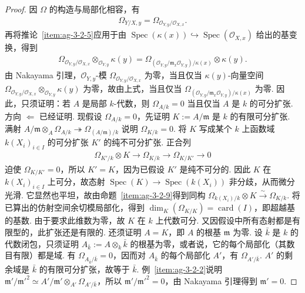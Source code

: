 \begin{proof}
因 $\Omega$ 的构造与局部化相容，有
\begin{align*}
\Omega_{Y/X,y}=\Omega_{\mathcal O_{Y,y}/\mathcal O_{X,x}}.
\end{align*}
再将推论~\ref{item:ag-3-2-5}应用于由 $\operatorname{Spec}(\kappa(x))\hookrightarrow\operatorname{Spec}(\mathcal O_{X,x})$ 给出的基变换，得到
\begin{align*}
\Omega_{\mathcal O_{Y,y}/\mathcal O_{X,x}}\otimes_{\mathcal O_{Y,y}}\kappa(y)=\Omega_{(\mathcal O_{Y,y}/\mathfrak m_x\mathcal O_{Y,y})/\kappa(x)}\otimes\kappa(y).
\end{align*}
由 Nakayama 引理，$\mathcal O_{Y,y}$-模 $\Omega_{\mathcal O_{Y,y}/\mathcal O_{X,x}}$ 为零，当且仅当 $\kappa(y)$-向量空间 $\Omega_{\mathcal O_{Y,y}/\mathcal O_{X,x}}\otimes_{\mathcal O_{Y,y}}\kappa(y)$ 为零，故由上式，当且仅当 $\Omega_{(\mathcal O_{Y,y}/\mathfrak m_x\mathcal O_{Y,y})/\kappa(x)}$ 为零.
因此，只须证明：若 $A$ 是局部 $k$-代数，则 $\Omega_{A/k}=0$ 当且仅当 $A$ 是 $k$ 的可分扩张. 方向 $\Leftarrow$ 已经证明.
现假设 $\Omega_{A/k}=0$，先证明 $K:=A/\mathfrak m$ 是 $k$ 的有限可分扩张. 满射 $A/\mathfrak m\otimes_A\Omega_{A/k}\twoheadrightarrow\Omega_{(A/\mathfrak m)/k}$ 说明 $\Omega_{K/k}=0$. 将 $K$ 写成某个 $k$ 上函数域 $k(X_i)_{i\in I}$ 的可分扩张 $K'$ 的纯不可分扩张. 正合列
\begin{align*}
\Omega_{K'/k}\otimes K\longrightarrow\Omega_{K/k}\longrightarrow\Omega_{K/K'}\longrightarrow0
\end{align*}
迫使 $\Omega_{K/K'}=0$，所以 $K'=K$，因为已假设 $K'$ 是纯不可分的. 因此 $K$ 在 $k(X_i)_{i\in I}$ 上可分，故态射 $\operatorname{Spec}(K)\longrightarrow\operatorname{Spec}(k(X_i))$ 非分歧，从而微分光滑. 它显然也平坦，故由命题~\ref{item:ag-3-2-9}得到同构 $\Omega_{k(X_i)/k}\otimes K\xrightarrow\sim\Omega_{K/k}$. 将已算出的仿射空间余切模局部化，得到 $\dim_K(\Omega_{K/K})=\operatorname{card}(I)$，即超越基的基数. 由于要求此维数为零，故 $K$ 在 $k$ 上代数可分. 又因假设中所有态射都是有限型的，此扩张还是有限的.
还须证明 $A=K$，即 $A$ 的根基 $\mathfrak m$ 为零. 设 $\bar k$ 是 $k$ 的代数闭包，只须证明 $A_{\bar k}:=A\otimes_k\bar k$ 的根基为零，或者说，它的每个局部化（其数目有限）都是域. 有 $\Omega_{A_{\bar k}/\bar k}=0$，因而对 $A_{\bar k}$ 的每个局部化 $A'$，有 $\Omega_{A'/\bar k}$. $A'$ 的剩余域是 $\bar k$ 的有限可分扩张，故等于 $\bar k$. 例~\ref{item:ag-3-2-2}说明 $\mathfrak m'/\mathfrak m'^2\simeq A'/\mathfrak m'\otimes_{A'}\Omega_{A'/\bar k}$，所以 $\mathfrak m'/\mathfrak m'^2=0$，由 Nakayama 引理得到 $\mathfrak m'=0$.
\end{proof}
